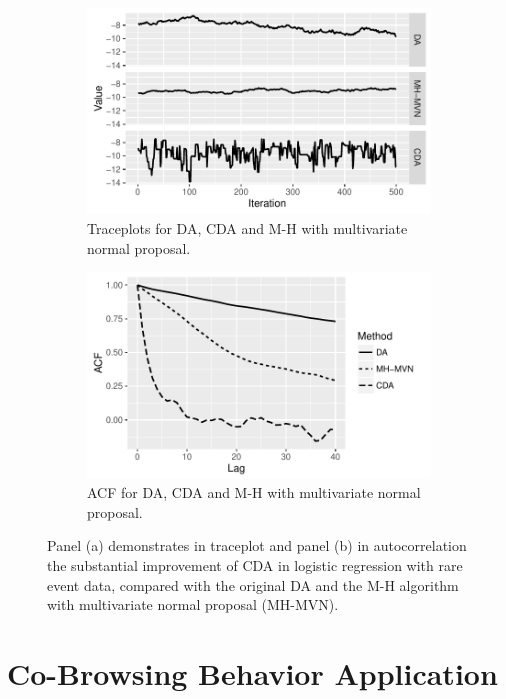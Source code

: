 \documentclass[12pt]{article}
\begin{document}
\begin{figure}[H]
  \begin{subfigure}[b]{0.49\textwidth}
 \includegraphics[width=1\textwidth]{logit_demo_trace_plot}
  \caption{Traceplots for DA, CDA and M-H with multivariate normal proposal.}
\end{subfigure}
  \hfill
   \begin{subfigure}[b]{0.49\textwidth}
 \includegraphics[width=1\textwidth]{logit_demo_acf}
  \caption{ACF for DA, CDA and M-H with multivariate normal proposal.}
\end{subfigure}
 \caption{Panel (a) demonstrates in traceplot and panel (b) in autocorrelation the substantial improvement of CDA in logistic regression with rare event data, compared with the original DA \citep{polson2013bayesian} and the M-H algorithm with multivariate normal proposal (MH-MVN).}
    \label{logit_random_mixing}
 \end{figure}
 
 
\section{Co-Browsing Behavior Application}
\end{document}
